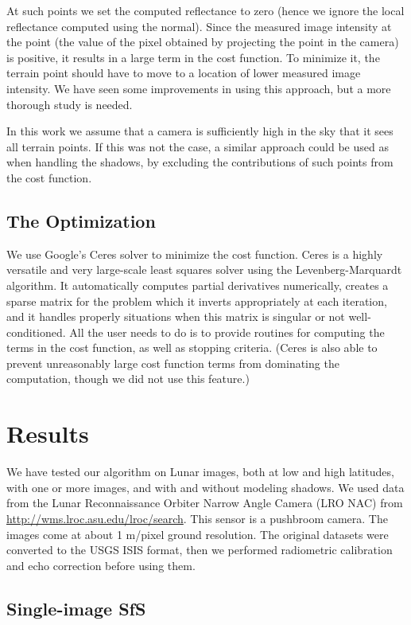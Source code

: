 \documentclass[12pt,oneside]{article}
\begin{document}
At such points we set the computed reflectance to zero (hence we ignore
the local reflectance computed using the normal). Since the measured
image intensity at the point (the value of the pixel obtained by
projecting the point in the camera) is positive, it results in a large
term in the cost function. To minimize it, the terrain point should have
to move to a location of lower measured image intensity. We have seen
some improvements in using this approach, but a more thorough study is
needed.

In this work we assume that a camera is sufficiently high in the sky
that it sees all terrain points. If this was not the case, a similar
approach could be used as when handling the shadows, by excluding the
contributions of such points from the cost function.

\subsection{The Optimization}

We use Google's Ceres solver \citet{agarwal2012ceres} to minimize the
cost function. Ceres is a highly versatile and very large-scale least
squares solver using the Levenberg-Marquardt algorithm. It automatically
computes partial derivatives numerically, creates a sparse matrix for
the problem which it inverts appropriately at each iteration, and it
handles properly situations when this matrix is singular or not
well-conditioned. All the user needs to do is to provide routines for computing
the terms in the cost function, as well as stopping
criteria. (Ceres is also able to prevent unreasonably large cost function
terms from dominating the computation, though we did not use this feature.)

\section{Results}

We have tested our algorithm on Lunar images, both at low and high
latitudes, with one or more images, and with and without modeling
shadows.  We used data from the Lunar Reconnaissance Orbiter Narrow
Angle Camera (LRO NAC) from
\url{http://wms.lroc.asu.edu/lroc/search}. This sensor is a pushbroom
camera. The images come at about 1 m/pixel ground resolution. The
original datasets were converted to the USGS ISIS format, then we
performed radiometric calibration and echo correction before using them.


\subsection{Single-image SfS}
\label{single}
\end{document}
